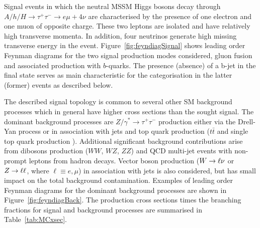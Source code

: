 Signal events in which the neutral MSSM Higgs bosons decay through 
$A/h/H \rightarrow \tau^+ \tau^- \rightarrow e \mu +4\nu$  are characterised 
by the presence of one electron and one muon of opposite charge. These two leptons are isolated and have 
relatively high transverse momenta. In addition, four neutrinos generate high missing transverse energy in the event. 
Figure~\ref{fig:feyndiagSignal} shows leading order Feynman diagrams for the two signal production modes considered,
gluon fusion and  associated production  with $b$-quarks.
The presence (absence) of a b-jet in the final state serves as  main characteristic for the categorisation
in the latter (former) events as described below.


The described signal topology  is common to several other  SM background  processes which in general  
have higher cross sections than the sought signal.
The dominant background processes are  $Z/\gamma^* \rightarrow \tau^+ \tau^- $ production
either via the  Drell-Yan process or in association with jets and  top quark production ($t\bar{t}$ and single top quark production ). 
Additional significant background contributions arise from  dibosons production 
($WW$, $WZ$, $ZZ$) and QCD multi-jet events with non-prompt leptons  from hadron decays.
Vector boson production ($W\rightarrow \ell \nu$ or $Z\rightarrow \ell \ell$, where $\ell \equiv e,\mu$)  in association with jets 
is also considered, but has small impact on the total background contamination. Examples of 
leading order Feynman diagrams for the dominant background processes are shown in Figure~\ref{fig:feyndiagBack}.
The production cross sections times the branching fractions for signal and background processes are summarised in
Table~\ref{tab:MCxsec}. 
%


